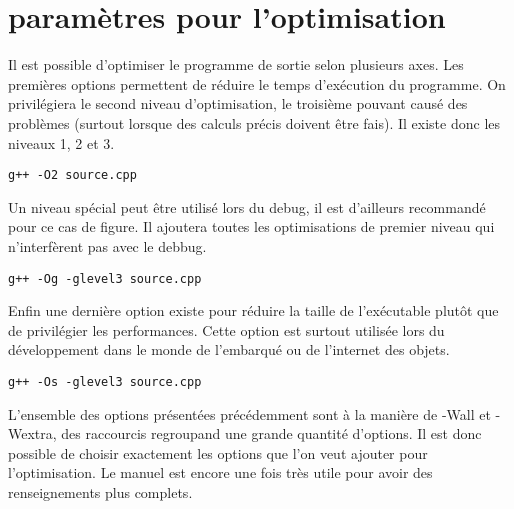 \documentclass[a4paper, 12pt]{article}
\begin{document}
\section{paramètres pour l'optimisation}
Il est possible d'optimiser le programme de sortie selon plusieurs axes. Les premières options permettent de réduire le temps d'exécution du programme.
On privilégiera le second niveau d'optimisation, le troisième pouvant causé des problèmes (surtout lorsque des calculs précis doivent être fais).
Il existe donc les niveaux 1, 2 et 3.
\begin{mdframed}[backgroundcolor=light-gray, roundcorner=20pt,
    innerleftmargin=20, innertopmargin=1, innerbottommargin=1, 
    outerlinewidth=1, linecolor=darkgray]
    \begin{lstlisting}
g++ -O2 source.cpp
    \end{lstlisting}
\end{mdframed}
Un niveau spécial peut être utilisé lors du debug, il est d'ailleurs recommandé pour ce cas de figure. Il ajoutera toutes les optimisations de premier niveau qui n'interfèrent pas avec le debbug.
\begin{mdframed}[backgroundcolor=light-gray, roundcorner=20pt,
    innerleftmargin=20, innertopmargin=1, innerbottommargin=1, 
    outerlinewidth=1, linecolor=darkgray]
    \begin{lstlisting}
g++ -Og -glevel3 source.cpp
    \end{lstlisting}
\end{mdframed}
Enfin une dernière option existe pour réduire la taille de l'exécutable plutôt que de privilégier les performances.
Cette option est surtout utilisée lors du développement dans le monde de l'embarqué ou de l'internet des objets.
\begin{mdframed}[backgroundcolor=light-gray, roundcorner=20pt,
    innerleftmargin=20, innertopmargin=1, innerbottommargin=1, 
    outerlinewidth=1, linecolor=darkgray]
    \begin{lstlisting}
g++ -Os -glevel3 source.cpp
    \end{lstlisting}
\end{mdframed}
L'ensemble des options présentées précédemment sont à la manière de -Wall et -Wextra, des raccourcis regroupand une grande quantité d'options.
Il est donc possible de choisir exactement les options que l'on veut ajouter pour l'optimisation. Le manuel est encore une fois très utile pour avoir des renseignements plus complets.
\end{document}
